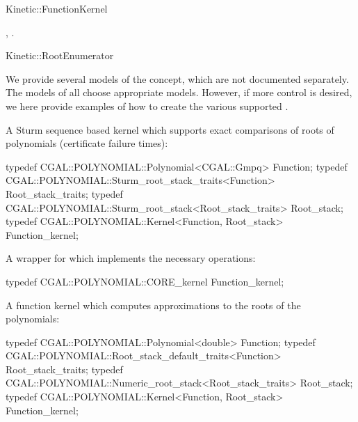 \begin{ccRefConcept}{Kinetic::FunctionKernel}









\ccHasModels
{}, .

\ccSeeAlso

Kinetic::RootEnumerator

\ccExample

We provide several models of the concept, which are not documented
separately. The models of  all choose
appropriate models.  However, if
more control is desired, we here provide examples of how to create the
various supported .

A Sturm sequence based kernel which supports exact comparisons of roots of polynomials (certificate failure times):
\begin{ccExampleCode}
typedef CGAL::POLYNOMIAL::Polynomial<CGAL::Gmpq> Function;
typedef CGAL::POLYNOMIAL::Sturm_root_stack_traits<Function> Root_stack_traits;
typedef CGAL::POLYNOMIAL::Sturm_root_stack<Root_stack_traits> Root_stack;
typedef CGAL::POLYNOMIAL::Kernel<Function, Root_stack> Function_kernel;
\end{ccExampleCode}

A wrapper for  which implements the necessary
operations:
\begin{ccExampleCode}
typedef CGAL::POLYNOMIAL::CORE_kernel Function_kernel;
\end{ccExampleCode}

A function kernel which computes approximations to the roots of the polynomials:
\begin{ccExampleCode}
typedef CGAL::POLYNOMIAL::Polynomial<double> Function;
typedef CGAL::POLYNOMIAL::Root_stack_default_traits<Function> Root_stack_traits;
typedef CGAL::POLYNOMIAL::Numeric_root_stack<Root_stack_traits> Root_stack;
typedef CGAL::POLYNOMIAL::Kernel<Function, Root_stack> Function_kernel;
\end{ccExampleCode}


\end{ccRefConcept}
